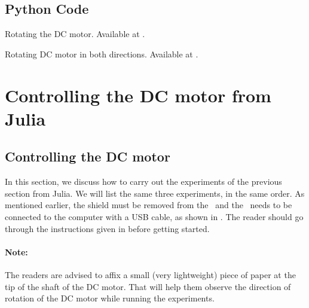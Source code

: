 

\subsection{Python Code}
\label{sec:dcmotor-python-code}

\begin{pycode}
  {Rotating the DC motor.  Available at
    .}
  \label{py:dcmotor-clock}
  
\end{pycode}

\begin{pycode}
  {Rotating DC motor in both directions.  Available at
    .}
  \label{py:dcmotor-both}
  
\end{pycode}

\begin{pycode}
  \label{py:dcmotor-loop}
  
\end{pycode}

\section{Controlling the DC motor from Julia}
\subsection{Controlling the DC motor}
In this section, we discuss how to carry out the experiments of the
previous section from Julia.  We will list the same three experiments,
in the same order. As mentioned earlier, the shield must be removed from 
the \arduino\ and the \arduino\ needs to be connected to the computer 
with a USB cable, as shown in . The reader should go through the instructions given in  before getting started.

\paragraph{Note:} The readers are advised to affix a small 
(very lightweight) piece of paper at the tip of the shaft of the DC motor. 
That will help them observe the direction of rotation 
of the DC motor while running the experiments.


